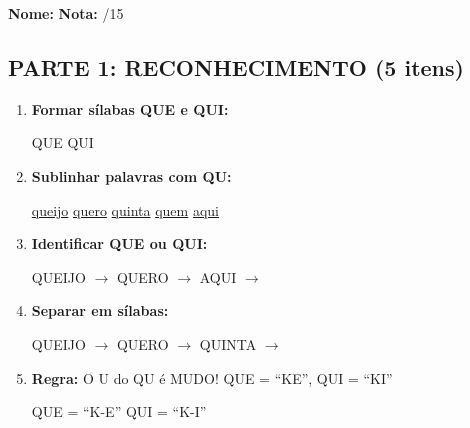 \begin{exercicio}

\noindent\textbf{Nome:} \underline{\hspace{4cm}} \quad \textbf{Nota:} \underline{\hspace{1cm}}/15

\subsection*{PARTE 1: RECONHECIMENTO (5 itens)}

\begin{enumerate}
  \item \textbf{Formar sílabas QUE e QUI:}
  \begin{center}
  QUE \quad QUI
  \end{center}

  \item \textbf{Sublinhar palavras com QU:}
  \begin{center}
  \uline{queijo} \quad \uline{quero} \quad \uline{quinta} \quad \uline{quem} \quad \uline{aqui}
  \end{center}

  \item \textbf{Identificar QUE ou QUI:}
  \begin{center}
  QUEIJO $\rightarrow$ \underline{\hspace{1cm}} \quad QUERO $\rightarrow$ \underline{\hspace{1cm}} \quad AQUI $\rightarrow$ \underline{\hspace{1cm}}
  \end{center}

  \item \textbf{Separar em sílabas:}
  \begin{center}
  QUEIJO $\rightarrow$ \underline{\hspace{1.5cm}} \underline{\hspace{1.5cm}} \quad QUERO $\rightarrow$ \underline{\hspace{1.5cm}} \underline{\hspace{1.5cm}} \quad QUINTA $\rightarrow$ \underline{\hspace{1.5cm}} \underline{\hspace{1.5cm}}
  \end{center}

  \item \textbf{Regra:} O U do QU é MUDO! QUE = ``KE'', QUI = ``KI''
  \begin{center}
  QUE = ``K-E'' \quad QUI = ``K-I''
  \end{center}
\end{enumerate}


\end{exercicio}
